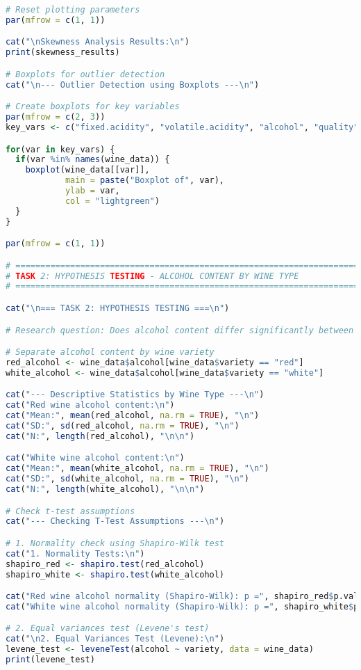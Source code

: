 \begin{lstlisting}[language=R, caption=Complete Wine Analysis R Script, breaklines=true]
# Reset plotting parameters
par(mfrow = c(1, 1))

cat("\nSkewness Analysis Results:\n")
print(skewness_results)

# Boxplots for outlier detection
cat("\n--- Outlier Detection using Boxplots ---\n")

# Create boxplots for key variables
par(mfrow = c(2, 3))
key_vars <- c("fixed.acidity", "volatile.acidity", "alcohol", "quality", "pH", "sulphates")

for(var in key_vars) {
  if(var %in% names(wine_data)) {
    boxplot(wine_data[[var]], 
            main = paste("Boxplot of", var),
            ylab = var,
            col = "lightgreen")
  }
}

par(mfrow = c(1, 1))

# =============================================================================
# TASK 2: HYPOTHESIS TESTING - ALCOHOL CONTENT BY WINE TYPE
# =============================================================================

cat("\n=== TASK 2: HYPOTHESIS TESTING ===\n")

# Research question: Does alcohol content differ significantly between red and white wines?

# Separate alcohol content by wine variety
red_alcohol <- wine_data$alcohol[wine_data$variety == "red"]
white_alcohol <- wine_data$alcohol[wine_data$variety == "white"]

cat("--- Descriptive Statistics by Wine Type ---\n")
cat("Red wine alcohol content:\n")
cat("Mean:", mean(red_alcohol, na.rm = TRUE), "\n")
cat("SD:", sd(red_alcohol, na.rm = TRUE), "\n")
cat("N:", length(red_alcohol), "\n\n")

cat("White wine alcohol content:\n")
cat("Mean:", mean(white_alcohol, na.rm = TRUE), "\n")
cat("SD:", sd(white_alcohol, na.rm = TRUE), "\n")
cat("N:", length(white_alcohol), "\n\n")

# Check t-test assumptions
cat("--- Checking T-Test Assumptions ---\n")

# 1. Normality check using Shapiro-Wilk test
cat("1. Normality Tests:\n")
shapiro_red <- shapiro.test(red_alcohol)
shapiro_white <- shapiro.test(white_alcohol)

cat("Red wine alcohol normality (Shapiro-Wilk): p =", shapiro_red$p.value, "\n")
cat("White wine alcohol normality (Shapiro-Wilk): p =", shapiro_white$p.value, "\n")

# 2. Equal variances test (Levene's test)
cat("\n2. Equal Variances Test (Levene):\n")
levene_test <- leveneTest(alcohol ~ variety, data = wine_data)
print(levene_test)


\end{lstlisting}
